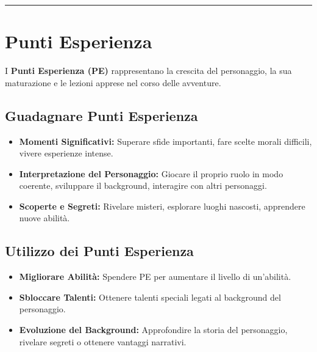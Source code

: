 \documentclass[../manuale_main.tex]{subfiles}
\begin{document}
\vspace{0.5cm}
\noindent
\begin{center}
\rule{\textwidth}{0.4pt} 
\end{center}
\vspace{0.5cm}

\section{Punti Esperienza}
I \textbf{Punti Esperienza (PE)} rappresentano la crescita del personaggio, la sua maturazione e le lezioni apprese nel corso delle avventure.

\subsection*{Guadagnare Punti Esperienza}
\begin{itemize}
    \item \textbf{Momenti Significativi:} Superare sfide importanti, fare scelte morali difficili, vivere esperienze intense.
    \item \textbf{Interpretazione del Personaggio:} Giocare il proprio ruolo in modo coerente, sviluppare il background, interagire con altri personaggi.
    \item \textbf{Scoperte e Segreti:} Rivelare misteri, esplorare luoghi nascosti, apprendere nuove abilità.
\end{itemize}

\subsection*{Utilizzo dei Punti Esperienza}
\begin{itemize}
    \item \textbf{Migliorare Abilità:} Spendere PE per aumentare il livello di un'abilità.
    \item \textbf{Sbloccare Talenti:} Ottenere talenti speciali legati al background del personaggio.
    \item \textbf{Evoluzione del Background:} Approfondire la storia del personaggio, rivelare segreti o ottenere vantaggi narrativi.
\end{itemize}
\end{document}
